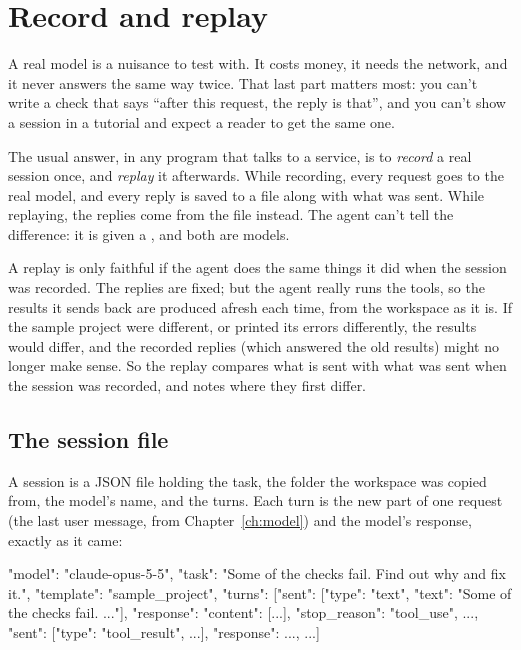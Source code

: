 \chapter{Record and replay}\label{ch:replay}

A real model is a nuisance to test with. It costs money, it needs the
network, and it never answers the same way twice. That last part matters
most: you can't write a check that says ``after this request, the reply is
that'', and you can't show a session in a tutorial and expect a reader to
get the same one.

The usual answer, in any program that talks to a service, is to
\emph{record} a real session once, and \emph{replay} it afterwards. While
recording, every request goes to the real model, and every reply is saved
to a file along with what was sent. While replaying, the replies come from
the file instead. The agent can't tell the difference: it is given a
, and both are models.

A replay is only faithful if the agent does the same things it did when
the session was recorded. The replies are fixed; but the agent really runs
the tools, so the results it sends back are produced afresh each time, from
the workspace as it is. If the sample project were different, or
 printed its errors differently, the results would differ, and
the recorded replies (which answered the old results) might no longer make
sense. So the replay compares what is sent with what was sent when the
session was recorded, and notes where they first differ.

\section{The session file}

A session is a JSON file holding the task, the folder the workspace was
copied from, the model's name, and the turns. Each turn is the new part of
one request (the last user message, from Chapter~\ref{ch:model}) and the
model's response, exactly as it came:

\begin{json}
{"model": "claude-opus-5-5",
 "task": "Some of the checks fail. Find out why and fix it.",
 "template": "sample_project",
 "turns": [{"sent": [{"type": "text", "text": "Some of the checks fail. ..."}],
            "response": {"content": [...], "stop_reason": "tool_use", ...}},
           {"sent": [{"type": "tool_result", ...}],
            "response": ...},
           ...]}
\end{json}

